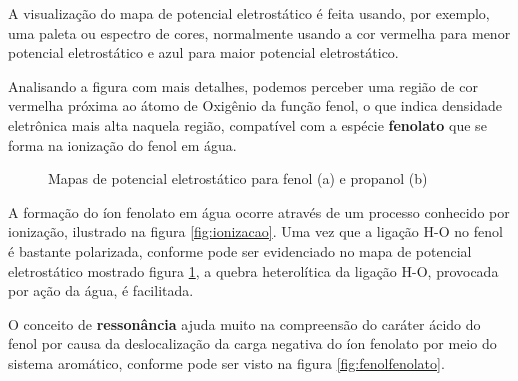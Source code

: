 A visualização do mapa de potencial eletrostático é feita usando, por exemplo, uma paleta ou espectro de cores, normalmente usando a cor vermelha para menor potencial eletrostático e azul para maior potencial eletrostático.

Analisando a figura  com mais detalhes, podemos perceber uma região de cor vermelha próxima ao átomo de Oxigênio da função fenol, o que indica densidade eletrônica mais alta naquela região, compatível com a espécie \textbf{fenolato} que se forma na ionização do fenol em água.

\begin{figure}[H]
	\caption{Mapas de potencial eletrostático para fenol (a) e propanol (b)}
\hfill
	\label{fig:subgraficos}
\end{figure}

A formação do íon fenolato em água ocorre através de um processo conhecido por ionização, ilustrado na figura \ref{fig:ionizacao}. Uma vez que a ligação H-O no fenol é bastante polarizada, conforme pode ser evidenciado no mapa de potencial eletrostático mostrado figura \ref{fig:subgraficos}, a quebra heterolítica da ligação H-O, provocada por ação da água, é facilitada.

O conceito de \textbf{ressonância} ajuda muito na compreensão do caráter ácido do fenol por causa da deslocalização da carga negativa do íon fenolato por meio do sistema aromático, conforme pode ser visto na figura \ref{fig:fenolfenolato}.

